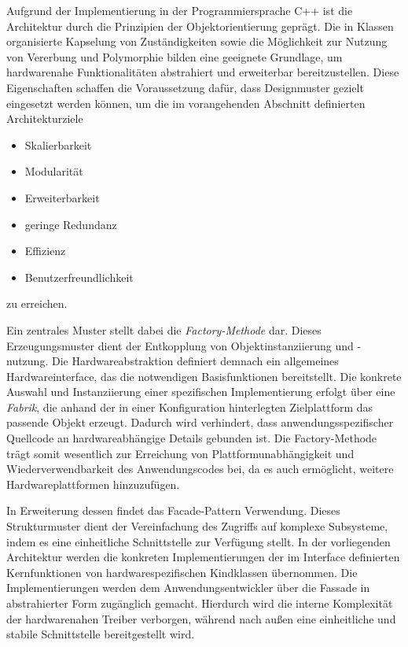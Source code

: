 Aufgrund der Implementierung in der Programmiersprache C++ ist die Architektur durch die Prinzipien der Objektorientierung geprägt. 
Die in Klassen organisierte Kapselung von Zuständigkeiten sowie die Möglichkeit zur Nutzung von Vererbung und Polymorphie bilden eine geeignete Grundlage, um hardwarenahe Funktionalitäten abstrahiert und erweiterbar bereitzustellen. 
Diese Eigenschaften schaffen die Voraussetzung dafür, dass Designmuster gezielt eingesetzt werden können, um die im vorangehenden Abschnitt definierten Architekturziele
\begin{itemize}
	\item Skalierbarkeit
	\item Modularität
	\item Erweiterbarkeit
	\item geringe Redundanz
	\item Effizienz
	\item Benutzerfreundlichkeit
\end{itemize}
 zu erreichen.

Ein zentrales Muster stellt dabei die \textit{Factory-Methode} dar.
Dieses Erzeugungsmuster dient der Entkopplung von Objektinstanziierung und -nutzung.
Die Hardwareabstraktion definiert demnach ein allgemeines Hardwareinterface, das die notwendigen Basisfunktionen bereitstellt.
Die konkrete Auswahl und Instanziierung einer spezifischen Implementierung erfolgt über eine \textit{Fabrik}, die anhand der in einer Konfiguration hinterlegten Zielplattform das passende Objekt erzeugt.
Dadurch wird verhindert, dass anwendungsspezifischer Quellcode an hardwareabhängige Details gebunden ist.
Die Factory-Methode trägt somit wesentlich zur Erreichung von Plattformunabhängigkeit und Wiederverwendbarkeit des Anwendungscodes bei, da es auch ermöglicht, weitere Hardwareplattformen hinzuzufügen.

In Erweiterung dessen findet das Facade-Pattern Verwendung. 
Dieses Strukturmuster dient der Vereinfachung des Zugriffs auf komplexe Subsysteme, indem es eine einheitliche Schnittstelle zur Verfügung stellt. 
In der vorliegenden Architektur werden die konkreten Implementierungen der im Interface definierten Kernfunktionen von hardwarespezifischen Kindklassen übernommen. 
Die Implementierungen werden dem Anwendungsentwickler über die Fassade in abstrahierter Form zugänglich gemacht. 
Hierdurch wird die interne Komplexität der hardwarenahen Treiber verborgen, während nach außen eine einheitliche und stabile Schnittstelle bereitgestellt wird.

